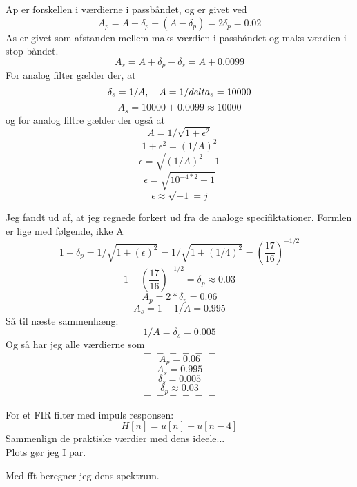 \begin{Opgaver}
\begin{kapitel}
\begin{Opgave}
        \end{Opgave}
    \end{kapitel}
    \begin{kapitel}
        \begin{Opgave}
            \begin{UnderOpgave}[Givet \text{$\delta_p = 0.01, \delta_s = 0.0001$}, hvad er Ap, As, \text{$\epsilon$} og A]
                Ap er forskellen i værdierne i passbåndet, og er givet ved 
                \[A_p = A+\delta_p - (A - \delta_p) = 2\delta_p = 0.02\]
                As er givet som afstanden mellem maks værdien i passbåndet og maks værdien i stop båndet. 
                \[A_s = A + \delta_p - \delta_s = A + 0.0099\] 
                For analog filter gælder der, at 
                \[\delta_s = 1/A, \tab{0} A = 1/delta_s = 10000\]
                \[A_s = 10000 + 0.0099 \approx 10000\]
                og for analog filtre gælder der også at
                \[A = 1/\sqrt{1 + \epsilon^2}\]
                \[1 + \epsilon^2 = (1/A)^2\]
                \[\epsilon = \sqrt{(1/A)^2 - 1}\]
                \[\epsilon = \sqrt{10^{-4*2} - 1}\]
                \[\epsilon \approx \sqrt{-1} = j\]
            \end{UnderOpgave} 
            \begin{UnderOpgave}[Givet \text{$\epsilon = 0.25, A = 200$} determine de relative specifikationer Ap, As og de absolutte specifikationer \text{$\delta_p, \delta_s$}]
                Jeg fandt ud af, at jeg regnede forkert ud fra de analoge specifiktationer. 
                Formlen er lige med følgende, ikke A
                \[1 - \delta_p = 1/\sqrt{1 + (\epsilon)^2} = 1/\sqrt{1 + (1/4)^2} = (\frac{17}{16})^{-1/2}\]
                \[1 - (\frac{17}{16})^{-1/2} = \delta_p \approx 0.03 \]
                \[A_p = 2 * \delta_p = 0.06\]
                \[A_s = 1 - 1/A  = 0.995\]
                Så til næste sammenhæng: 
                \[1/A = \delta_s = 0.005\]
                Og så har jeg alle værdierne som 
                \[======\]
                \[A_p = 0.06\]
                \[A_s = 0.995\]
                \[\delta_s = 0.005\]
                \[\delta_p \approx 0.03\]
                \[======\]
            \end{UnderOpgave}   
        \end{Opgave}       
        \begin{Opgave}  
            For et FIR filter med impuls responsen: 
            \[H[n] = u[n] - u[n - 4]\]
            Sammenlign de praktiske værdier med dens ideele...\\
            Plots gør jeg I par. 
            \begin{UnderOpgave}
                Med fft beregner jeg dens spektrum. 
            \end{UnderOpgave}
            



\end{Opgave}
\end{kapitel}
\end{Opgaver}
